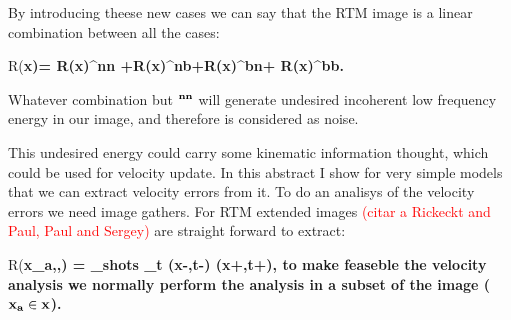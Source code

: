 By introducing theese new cases we can say that the RTM image is a linear combination between all the cases:

\beq
R(\bf{x})= R(\bf{x})^{nn} +R(\bf{x})^{nb}+R(\bf{x})^{bn}+ R(\bf{x})^{bb}.
\label{eq:cases}
\eeq

Whatever combination but $\bf^{nn}$ will generate undesired incoherent low frequency energy in our image, and therefore
is considered as noise.

This undesired energy could carry some kinematic information thought,  which could be used for velocity update. In this abstract 
I show for very simple models that we can extract velocity errors from it. To do an analisys of the velocity errors we need image gathers.
 For RTM extended images \textcolor{red}{(citar a Rickeckt and Paul, Paul and Sergey)} are straight forward to extract:

\beq
R(\bf{x_a},\bf{\lambda},\tau) =  \sum_{shots} \sum_t \US(\bf{x}-\bf{\lambda},t-\tau) \UR(\bf{x}+\bf{\lambda},t+\tau),
\eeq
to make feaseble the velocity analysis we normally perform the analysis in a subset of the image ($\bf{x_a} \in \bf{x}$).



